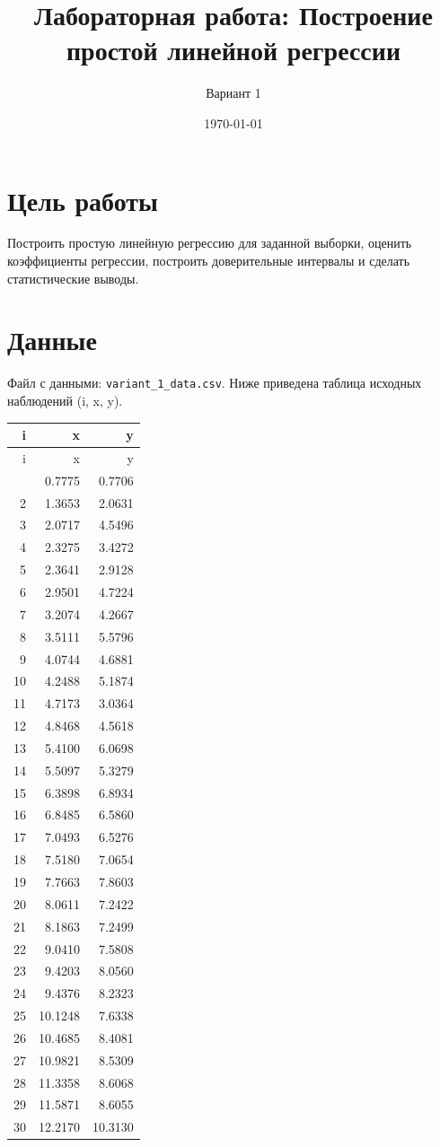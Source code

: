 \documentclass[12pt,a4paper]{article}
\title{Лабораторная работа: Построение простой линейной регрессии}
\author{Вариант 1}
\date{\today}
\begin{document}
\maketitle

\section*{Цель работы}
Построить простую линейную регрессию для заданной выборки, оценить коэффициенты регрессии, построить доверительные интервалы и сделать статистические выводы.

\section{Данные}
Файл с данными: \texttt{variant\_1\_data.csv}. Ниже приведена таблица исходных наблюдений (i, x, y).

\begin{longtable}{rrr}
\toprule
 i & x & y \\
\midrule
\endfirsthead
\toprule
 i & x & y \\
\midrule
\endhead
\bottomrule
\endfoot
 1 & 0.7775 & 0.7706 \\
 2 & 1.3653 & 2.0631 \\
 3 & 2.0717 & 4.5496 \\
 4 & 2.3275 & 3.4272 \\
 5 & 2.3641 & 2.9128 \\
 6 & 2.9501 & 4.7224 \\
 7 & 3.2074 & 4.2667 \\
 8 & 3.5111 & 5.5796 \\
 9 & 4.0744 & 4.6881 \\
 10 & 4.2488 & 5.1874 \\
 11 & 4.7173 & 3.0364 \\
 12 & 4.8468 & 4.5618 \\
 13 & 5.4100 & 6.0698 \\
 14 & 5.5097 & 5.3279 \\
 15 & 6.3898 & 6.8934 \\
 16 & 6.8485 & 6.5860 \\
 17 & 7.0493 & 6.5276 \\
 18 & 7.5180 & 7.0654 \\
 19 & 7.7663 & 7.8603 \\
 20 & 8.0611 & 7.2422 \\
 21 & 8.1863 & 7.2499 \\
 22 & 9.0410 & 7.5808 \\
 23 & 9.4203 & 8.0560 \\
 24 & 9.4376 & 8.2323 \\
 25 & 10.1248 & 7.6338 \\
 26 & 10.4685 & 8.4081 \\
 27 & 10.9821 & 8.5309 \\
 28 & 11.3358 & 8.6068 \\
 29 & 11.5871 & 8.6055 \\
 30 & 12.2170 & 10.3130 \\
\end{longtable}
\end{document}
